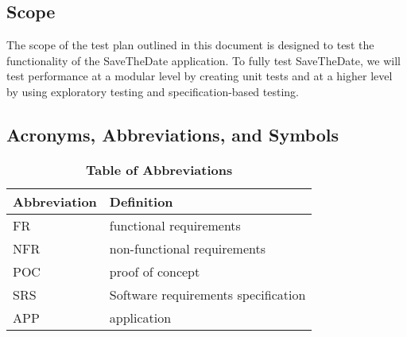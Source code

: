 \documentclass[12pt, titlepage]{article}
\begin{document}
\subsection{Scope}

The scope of the test plan outlined in this document is designed to test the functionality of the SaveTheDate application. To fully test SaveTheDate, we will test performance at a modular level by creating unit tests and at a higher level by using exploratory testing and specification-based testing. 

\newpage

\subsection{Acronyms, Abbreviations, and Symbols}
	
\begin{table}[hbp]
\caption{\textbf{Table of Abbreviations}} \label{Table}

\begin{tabularx}{\textwidth}{p{3cm}X}
\toprule
\textbf{Abbreviation} & \textbf{Definition} \\
\midrule
FR & functional requirements\\
NFR & non-functional requirements\\
POC & proof of concept\\
SRS & Software requirements specification\\
APP & application\\
\bottomrule
\end{tabularx}

\end{table}
\end{document}
